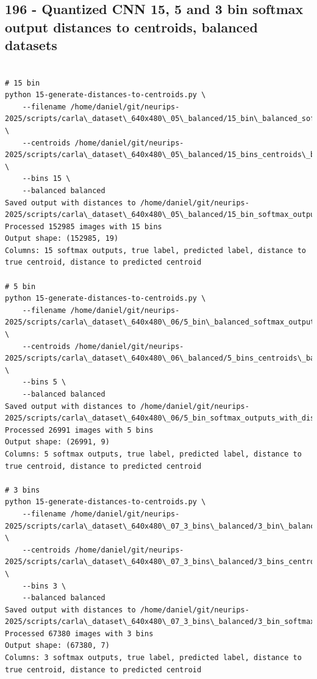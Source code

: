 \subsection{196 - Quantized CNN 15, 5 and 3 bin softmax output distances to centroids, balanced datasets}
\label{app_res:196}

\begin{verbatim}

# 15 bin
python 15-generate-distances-to-centroids.py \
    --filename /home/daniel/git/neurips-2025/scripts/carla\_dataset\_640x480\_05\_balanced/15_bin\_balanced_softmax_outputs.npy \
    --centroids /home/daniel/git/neurips-2025/scripts/carla\_dataset\_640x480\_05\_balanced/15_bins_centroids\_balanced.npy \
    --bins 15 \
    --balanced balanced
Saved output with distances to /home/daniel/git/neurips-2025/scripts/carla\_dataset\_640x480\_05\_balanced/15_bin_softmax_outputs_with_distances\_balanced.npy
Processed 152985 images with 15 bins
Output shape: (152985, 19)
Columns: 15 softmax outputs, true label, predicted label, distance to true centroid, distance to predicted centroid

# 5 bin
python 15-generate-distances-to-centroids.py \
    --filename /home/daniel/git/neurips-2025/scripts/carla\_dataset\_640x480\_06/5_bin\_balanced_softmax_outputs.npy \
    --centroids /home/daniel/git/neurips-2025/scripts/carla\_dataset\_640x480\_06\_balanced/5_bins_centroids\_balanced.npy \
    --bins 5 \
    --balanced balanced   
Saved output with distances to /home/daniel/git/neurips-2025/scripts/carla\_dataset\_640x480\_06/5_bin_softmax_outputs_with_distances\_balanced.npy
Processed 26991 images with 5 bins
Output shape: (26991, 9)
Columns: 5 softmax outputs, true label, predicted label, distance to true centroid, distance to predicted centroid

# 3 bins
python 15-generate-distances-to-centroids.py \
    --filename /home/daniel/git/neurips-2025/scripts/carla\_dataset\_640x480\_07_3_bins\_balanced/3_bin\_balanced_softmax_outputs.npy \
    --centroids /home/daniel/git/neurips-2025/scripts/carla\_dataset\_640x480\_07_3_bins\_balanced/3_bins_centroids\_balanced.npy \
    --bins 3 \
    --balanced balanced
Saved output with distances to /home/daniel/git/neurips-2025/scripts/carla\_dataset\_640x480\_07_3_bins\_balanced/3_bin_softmax_outputs_with_distances\_balanced.npy
Processed 67380 images with 3 bins
Output shape: (67380, 7)
Columns: 3 softmax outputs, true label, predicted label, distance to true centroid, distance to predicted centroid    

\end{verbatim}

